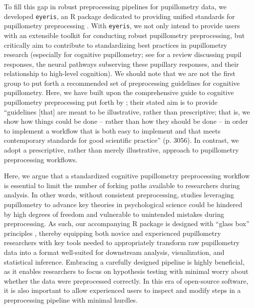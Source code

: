 To fill this gap in robust preprocessing pipelines for pupillometry data, we developed \texttt{eyeris}, an R package dedicated to providing unified standards for pupillometry preprocessing \parencite{schwartz2025eyeris}. With \texttt{eyeris}, we not only intend to provide users with an extensible toolkit for conducting robust pupillometry preprocessing, but critically aim to contribute to standardizing best practices in pupillometry research (especially for cognitive pupillometry; see \textcite{mathot2018pupillometry} for a review discussing pupil responses, the neural pathways subserving these pupillary responses, and their relationship to high-level cognition). We should note that we are not the first group to put forth a recommended set of preprocessing guidelines for cognitive pupillometry. Here, we have built upon the comprehensive guide to cognitive pupillometry preprocessing put forth by \textcite{mathot2023methods}; their stated aim is to provide ``guidelines [that] are meant to be illustrative, rather than prescriptive; that is, we show how things could be done – rather than how they should be done – in order to implement a workflow that is both easy to implement and that meets contemporary standards for good scientific practice'' (p. 3056). In contrast, we adopt a prescriptive, rather than merely illustrative, approach to pupillometry preprocessing workflows.

Here, we argue that a standardized cognitive pupillometry preprocessing workflow is essential to limit the number of forking paths available to researchers during analysis. In other words, without consistent preprocessing, studies leveraging pupillometry to advance key theories in psychological science could be hindered by high degrees of freedom and vulnerable to unintended mistakes during preprocessing. As such, our accompanying R package is designed with ``glass box'' principles \parencite[see][]{esteban2019fmriprep,poldrack2019computational}, thereby equipping both novice and experienced pupillometry researchers with key tools needed to appropriately transform raw pupillometry data into a format well-suited for downstream analysis, visualization, and statistical inference. Embracing a carefully designed pipeline is highly beneficial, as it enables researchers to focus on hypothesis testing with minimal worry about whether the data were preprocessed correctly. In this era of open-source software, it is also important to allow experienced users to inspect and modify steps in a preprocessing pipeline with minimal hurdles.

